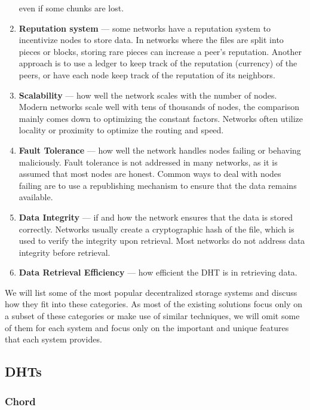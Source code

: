 \begin{enumerate}
        even if some chunks are lost.
    \item \textbf{Reputation system} --- some networks have a reputation system
        to incentivize nodes to store data.
        In networks where the files are split into pieces or blocks,
        storing rare pieces can increase a peer's reputation.
        Another approach is to use a ledger to keep track of the reputation (currency) of the peers,
        or have each node keep track of the reputation of its neighbors.
    \item \textbf{Scalability} --- how well the network scales with the number of nodes.
        Modern networks scale well with tens of thousands of nodes,
        the comparison mainly comes down to optimizing the constant factors.
        Networks often utilize locality or proximity to optimize the routing and speed.
    \item \textbf{Fault Tolerance} --- how well the network handles nodes failing or behaving maliciously.
        Fault tolerance is not addressed in many networks, as it is assumed that most nodes are honest.
        Common ways to deal with nodes failing are to use a republishing mechanism
        to ensure that the data remains available.
    \item \textbf{Data Integrity} --- if and how the network ensures that the data is stored correctly.
        Networks usually create a cryptographic hash of the file,
        which is used to verify the integrity upon retrieval.
        Most networks do not address data integrity before retrieval.
    \item \textbf{Data Retrieval Efficiency} --- how efficient the DHT is in retrieving data.
\end{enumerate}

We will list some of the most popular decentralized storage systems and discuss how they fit into these categories.
As most of the existing solutions focus only on a subset of these categories
or make use of similar techniques,
we will omit some of them for each system and focus only on the important and unique features
that each system provides.

\subsection{DHTs}

\subsubsection{Chord}

